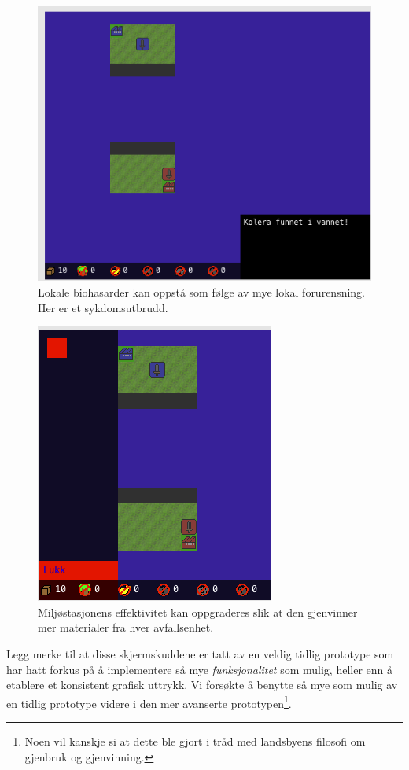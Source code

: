 \begin{center}
	\begin{figure}
		\includegraphics[width=\textwidth]{images/Kolera.png}
		\caption{Lokale biohasarder kan oppstå som følge av mye lokal forurensning. Her er et sykdomsutbrudd.}
		\label{fig:Kolera}
	\end{figure}
\end{center}

\begin{center}
	\begin{figure}
		\includegraphics{images/OppgradereEnv.png}
		\caption{Miljøstasjonens effektivitet kan oppgraderes slik at den gjenvinner mer materialer fra hver avfallsenhet.}
		\label{fig:OppgradereEnv}
	\end{figure}
\end{center}



Legg merke til at disse skjermskuddene er tatt av en veldig tidlig prototype som har hatt forkus på å implementere så mye \emph{funksjonalitet} som mulig, heller enn å etablere et konsistent grafisk uttrykk. Vi forsøkte å benytte så mye som mulig av en tidlig prototype videre i den mer avanserte prototypen\footnote{Noen vil kanskje si at dette ble gjort i tråd med landsbyens filosofi om gjenbruk og gjenvinning.}.